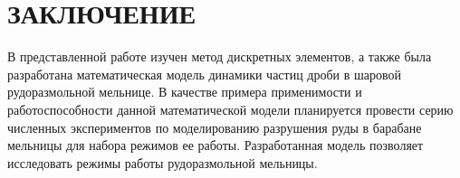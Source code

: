 \documentclass[utf8x, 14pt, oneside, a4paper]{article}
\begin{document}
		\pagebreak

	\section*{ЗАКЛЮЧЕНИЕ}

В представленной работе изучен метод дискретных элементов, а также была разработана математическая модель динамики частиц дроби в шаровой рудоразмольной мельнице.
В качестве примера применимости и работоспособности данной математической модели планируется провести серию численных экспериментов по моделированию разрушения руды в барабане мельницы для набора режимов ее работы.
Разработанная модель позволяет исследовать режимы работы рудоразмольной мельницы.

		\pagebreak
\end{document}
